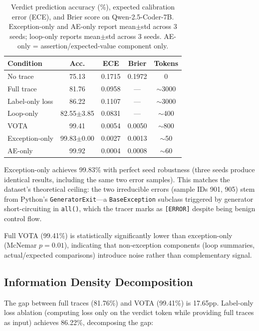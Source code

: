 \documentclass[11pt,a4paper]{article}
\begin{document}
\begin{table}[t]
\centering
\small
\begin{tabular}{lcccc}
\toprule
\textbf{Condition} & \textbf{Acc.} & \textbf{ECE} & \textbf{Brier} & \textbf{Tokens} \\
\midrule
No trace        & 75.13 & 0.1715 & 0.1972 & 0 \\
Full trace      & 81.76 & 0.0958 & ---    & ${\sim}$3000 \\
Label-only loss & 86.22 & 0.1107 & ---    & ${\sim}$3000 \\
Loop-only       & 82.55{\tiny$\pm$3.85} & 0.0831 & ---    & ${\sim}$400 \\
VOTA            & 99.41 & 0.0054 & 0.0050 & ${\sim}$800 \\
Exception-only  & 99.83{\tiny$\pm$0.00} & 0.0027 & 0.0013 & ${\sim}$50 \\
AE-only         & 99.92 & 0.0004 & 0.0008 & ${\sim}$60 \\
\bottomrule
\end{tabular}
\caption{Verdict prediction accuracy (\%), expected calibration error (ECE), and Brier score on Qwen-2.5-Coder-7B. Exception-only and AE-only report mean$\pm$std across 3 seeds; loop-only reports mean$\pm$std across 3 seeds. AE-only = assertion/expected-value component only.}
\label{tab:main-results}
\end{table}

Exception-only achieves 99.83\% with perfect seed robustness (three seeds produce identical results, including the same two error samples).
This matches the dataset's theoretical ceiling: the two irreducible errors (sample IDs 901, 905) stem from Python's \texttt{GeneratorExit}---a \texttt{BaseException} subclass triggered by generator short-circuiting in \texttt{all()}, which the tracer marks as \texttt{[ERROR]} despite being benign control flow.

Full VOTA (99.41\%) is statistically significantly lower than exception-only (McNemar $p = 0.01$), indicating that non-exception components (loop summaries, actual/expected comparisons) introduce noise rather than complementary signal.

\subsection{Information Density Decomposition}

The gap between full traces (81.76\%) and VOTA (99.41\%) is 17.65pp.
Label-only loss ablation (computing loss only on the verdict token while providing full traces as input) achieves 86.22\%, decomposing the gap:
\end{document}
